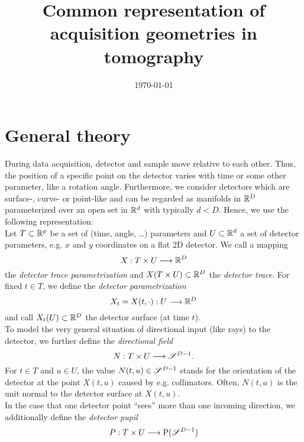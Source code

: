 \documentclass{amsart}
\title{Common representation of acquisition geometries in tomography}
\author{}
\date{\today}
\begin{document}
\maketitle




\section{General theory}
\label{sec:general}
%
%
%
During data acquisition, detector and sample move relative to each other. Thus, the position of a specific point on the detector varies 
with time or some other parameter, like a rotation angle. Furthermore, we consider detectors which are surface-, curve- or point-like and 
can be regarded as manifolds in ${\mathbb{R}}^D$ parameterized over an open set in ${\mathbb{R}}^d$ with typically $d < D$. Hence, we use the following 
representation:\\
Let $T \subset {\ensuremath{\mathbb{R}}}^p$ be a set of (time, angle, \ldots) parameters and $U \subset {\ensuremath{\mathbb{R}}}^d$ a set of detector parameters, e.g. $x$ and $y$ 
coordinates on a flat 2D detector. We call a mapping
%
\begin{equation}
 \label{eq:general:detector}
 X: T \times U \longrightarrow {\ensuremath{\mathbb{R}}}^D
\end{equation}
%
the \emph{detector trace parametrization} and $X(T \times U) \subset {\ensuremath{\mathbb{R}}}^D$ the \emph{detector trace}. For fixed $t \in T$, we define the 
\emph{detector parametrization}
%
\begin{equation}
 \label{eq:general:detector_fixedfirst}
 X_t = X(t, \cdot) : U \longrightarrow {\ensuremath{\mathbb{R}}}^D
\end{equation} 
%
and call $X_t(U) \subset {\ensuremath{\mathbb{R}}}^D$ the detector surface (at time $t$).\\[1ex]
%
%
To model the very general situation of directional input (like rays) to the detector, we further define the \emph{directional field}
%
\begin{equation}
 \label{eq:general:dirfield}
 N: T \times U \longrightarrow \mathscr{S}^{D-1}.
\end{equation}
%
For $t \in T$ and $u \in U$, the value $N(t, u) \in \mathscr{S}^{D-1}$ stands for the orientation of the detector at the point $X(t,u)$ caused 
by e.g. collimators. Often, $N(t, u)$ is the unit normal to the detector surface at $X(t, u)$. \\[1ex]
%
%
In the case that one detector point ``sees'' more than one incoming direction, we additionally define the 
\emph{detector pupil}
%
\begin{equation}
 \label{eq:general:detector_pupil}
 P: T \times U \longrightarrow \mathrm{P}(\mathscr{S}^{D-1})
\end{equation} 
\end{document}
